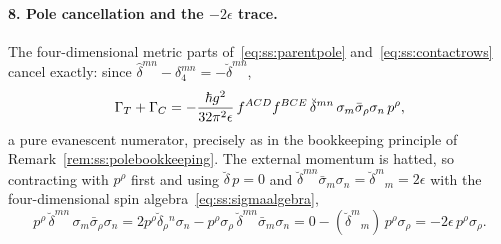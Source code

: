 \paragraph{8. Pole cancellation and the $-2\epsilon$ trace.}
The four-dimensional metric parts of~\eqref{eq:ss:parentpole}
and~\eqref{eq:ss:contactrows} cancel exactly: since
$\widehat\delta^{mn}-\delta_4^{mn}=-\breve\delta^{mn}$,
\begin{equation}\label{eq:ss:polecancel}
\Gamma_{T}+\Gamma_{C}
=-\frac{\hbar g^{2}}{32\pi^{2}\epsilon}\,
f^{ACD}f^{BCE}\,\breve\delta^{mn}\,
\sigma_m\bar\sigma_\rho\sigma_n\,p^{\rho} ,
\end{equation}
a pure evanescent numerator, precisely as in the bookkeeping principle of
Remark~\ref{rem:ss:polebookkeeping}. The external momentum is hatted, so
contracting with $p^{\rho}$ first and using $\breve\delta\,p=0$ and
$\breve\delta^{mn}\bar\sigma_m\sigma_n=\breve\delta^{m}{}_{m}=2\epsilon$
with the four-dimensional spin algebra~\eqref{eq:ss:sigmaalgebra},
\begin{equation}\label{eq:ss:sigmatrace}
p^{\rho}\,\breve\delta^{mn}\,\sigma_m\bar\sigma_\rho\sigma_n
=2p^{\rho}\breve\delta_{\rho}{}^{n}\sigma_n
-p^{\rho}\sigma_\rho\,\breve\delta^{mn}\bar\sigma_m\sigma_n
=0-(\breve\delta^{m}{}_{m})\,p^{\rho}\sigma_\rho
=-2\epsilon\,p^{\rho}\sigma_\rho .
\end{equation}

